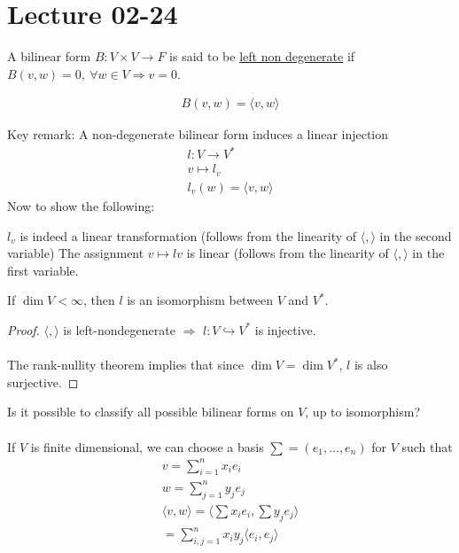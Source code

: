 \documentclass[class=scrartcl, crop=false]{standalone}
\date{2020-02-24}
\begin{document}
\section{Lecture 02-24}

\begin{definition}
  A bilinear form $B: V \times V \to F$ is said to be \ul{left non degenerate} if $B(v, w) = 0, \ \forall w \in V \Rightarrow v = 0$.
  \begin{note}
    \begin{gather*}
      B(v, w) = \langle v, w \rangle
    \end{gather*} 
  \end{note} 
  Key remark: A non-degenerate bilinear form induces a linear injection
  \begin{gather*}
    l: V \to V^* \\
    v \mapsto l_v \\
    l_v(w) = \langle v, w \rangle
  \end{gather*} 
  Now to show the following:
  \begin{enumerate}
    \ii
    $l_v$ is indeed a linear transformation (follows from the linearity of $\langle, \rangle$ in the second variable)
    \ii
    The assignment $v \mapsto lv$ is linear (follows from the linearity of $\langle , \rangle$ in the first variable.
  \end{enumerate} 
\end{definition} 

\begin{lemma}
  If $\dim V < \infty$, then $l$ is an isomorphism between $V$ and $V^*$. 
  \begin{proof}
    $\langle, \rangle$ is left-nondegenerate $\Rightarrow$ $l: V \hookrightarrow V^*$ is injective.
    \\\\
    The rank-nullity theorem implies that since $\dim V = \dim V^*$,  $l$ is also surjective.
  \end{proof} 
\end{lemma} 

\begin{exercise}
  Is it possible to classify all possible bilinear forms on $V$, up to isomorphism?
  \\\\
  If $V$ is finite dimensional, we can choose a basis $\sum = (e_1, \dots, e_n)$ for $V$ such that
  \begin{gather*}
    v = \sum_{i = 1}^{n}x_ie_i \\
    w = \sum_{j = 1}^{n}y_je_j \\
    \langle v , w \rangle = \langle \sum x_ie_i, \sum y_je_j \rangle \\
    = \sum_{i, j = 1}^{n} x_i y_j \langle e_i, e_j \rangle
  \end{gather*} 
\end{exercise} 
\end{document}
